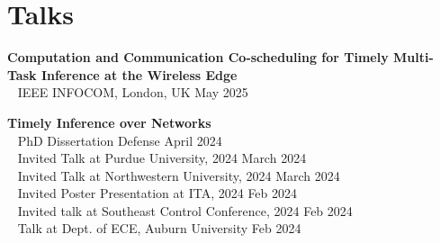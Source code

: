 \documentclass[letterpaper,11pt]{article}
\begin{document}







%
\section*{Talks}

\textbf{Computation and Communication Co-scheduling for Timely Multi-Task Inference at the Wireless Edge} \\
\quad\textbullet~ IEEE INFOCOM, London, UK \hfill May 2025
\medskip

\textbf{Timely Inference over Networks} \\
\quad\textbullet~ PhD Dissertation Defense \hfill April 2024 \\
\quad\textbullet~ Invited Talk at Purdue University, 2024 \hfill March 2024 \\
\quad\textbullet~ Invited Talk at Northwestern University, 2024 \hfill March 2024 \\
\quad\textbullet~ Invited Poster Presentation at ITA, 2024 \hfill Feb 2024 \\
\quad\textbullet~ Invited talk at Southeast Control Conference, 2024 \hfill Feb 2024 \\
\quad\textbullet~ Talk at Dept. of ECE, Auburn University \hfill Feb 2024
\medskip
\end{document}

